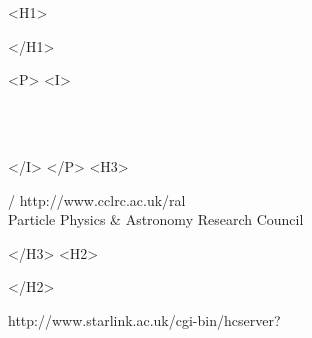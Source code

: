 \begin{htmlonly}
   \xlabel{}
   \begin{rawhtml} <H1> \end{rawhtml}
      \stardoctitle
   \begin{rawhtml} </H1> \end{rawhtml}


   \begin{rawhtml} <P> <I> \end{rawhtml}
   \stardoccategory \stardocnumber \\
   \stardocauthors \\
   \stardocdate
   \begin{rawhtml} </I> </P> <H3> \end{rawhtml}
       /
                        {http://www.cclrc.ac.uk/ral} \\
      Particle Physics \& Astronomy Research Council \\
   \begin{rawhtml} </H3> <H2> \end{rawhtml}
   \begin{rawhtml} </H2> \end{rawhtml}
      {http://www.starlink.ac.uk/cgi-bin/hcserver?\stardocsource}\\



\end{htmlonly}

